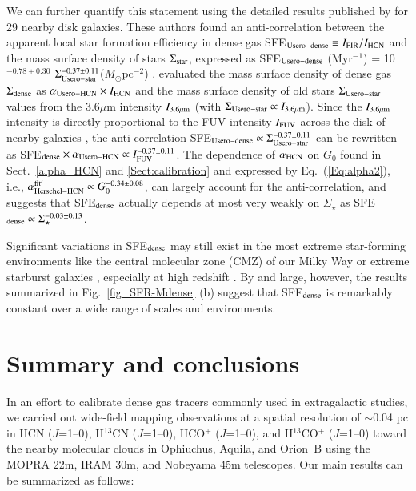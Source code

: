 \documentclass{aa}
\begin{document}
{{We can further quantify this statement using the detailed results published by \citet{Usero15} for 29 nearby disk galaxies. 
These authors found an anti-correlation between the apparent local star formation efficiency in dense gas SFE$_{\rm Usero-dense} \equiv I_{\rm FIR}/I_{\rm HCN}$
and the mass surface density of stars  $\Sigma_{\rm star}$,  expressed as 
SFE$_{\rm Usero-dense}$ (Myr$^{-1}$) = 10$^{-0.78\pm0.30}$ $\Sigma_{\rm Usero-star}^{-0.37\pm0.11}$($M_{\odot}$pc$^{-2}$)  \citep[Fig.~2 of ][]{Usero15}.  
\citet{Usero15} evaluated the mass surface density of dense gas  $\Sigma_{\rm dense}$ as $\alpha_{\rm Usero-HCN} \times I_{\rm HCN}$
and the mass surface density of old stars $\Sigma_{\rm Usero-star}$ values from the $3.6 \mu$m intensity $I_{\rm 3.6 \mu m}$ 
(with $\Sigma_{\rm Usero-star} \propto I_{\rm 3.6 \mu m}$). 
Since the $I_{\rm 3.6 \mu m}$ intensity is directly proportional to the FUV intensity $I_{\rm FUV}$ across the disk of nearby galaxies \citep[e.g.][]{Ford13}, 
the anti-correlation SFE$_{\rm Usero-dense} \propto  \Sigma_{\rm Usero-star}^{-0.37\pm0.11}$ 
can be rewritten as SFE$_{\rm dense} \times \alpha_{\rm Usero-HCN}  \propto I_{\rm FUV}^{-0.37\pm0.11}$. 
The dependence of $\alpha_{\rm HCN}$ on $G_0$ found in Sect.~\ref{alpha_HCN} and \ref{Sect:calibration} and expressed by Eq.~(\ref{Eq:alpha2}), i.e., 
$\alpha_{\rm Herschel-HCN}^{\rm fit^\prime} \propto G_0^{-0.34\pm0.08}$, can largely account for the \citet{Usero15} anti-correlation, 
and suggests that SFE$_{\rm dense}$ actually depends at most very weakly on $\Sigma_\star$ 
as SFE$_{\rm dense} \propto \Sigma_\star^{-0.03\pm0.13}$.


Significant variations in SFE$_{\rm dense}$ may still exist in the most extreme star-forming environments 
like the central molecular zone (CMZ) of our Milky Way 
{\citep[e.g.][see also Fig. \ref{fig_SFR-Mdense}]{Longmore13}} or extreme starburst galaxies \citep[e.g.][]{Garcia12}, 
especially at high redshift \citep[e.g.][]{Gao07}. 
By and large, however, the results summarized in Fig.~\ref{fig_SFR-Mdense} (b) suggest that SFE$_{\rm dense}$ 
is remarkably constant over a wide range of scales and environments.






\section{Summary and conclusions}
In an effort to calibrate dense gas tracers commonly used in extragalactic studies, 
we carried out wide-field mapping observations at a spatial resolution of $\sim$0.04 pc in HCN ($J$=1--0), H$^{13}$CN ($J$=1--0),  HCO$^+$ ($J$=1--0), 
and H$^{13}$CO$^+$ ($J$=1--0) toward the nearby molecular clouds in Ophiuchus, Aquila, and Orion~B  
using the MOPRA 22m, IRAM 30m, and Nobeyama 45m telescopes. 
Our main results can be summarized as follows:

}}
\end{document}
